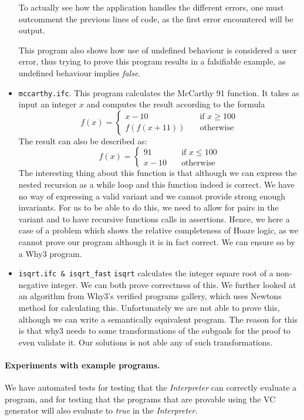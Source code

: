 \begin{itemize}
	To actually see how the application handles the different errors, one must outcomment the previous lines of code, as the first error encountered will be output.

	This program also shows how use of undefined behaviour is considered a user error, thus trying to prove this program results in a falsifiable example, as undefined behaviour implies \textit{false}.

  \item{\texttt{mccarthy.ifc}.}
   This program calculates the McCarthy 91 function. It takes as input an integer $x$ and computes the result according to the formula
	\[ f(x) =
	  \begin{cases}
	    x - 10       & \quad \text{if } x \ge 100 \\
	    f(f(x + 11))  & \quad \text{otherwise}
	  \end{cases}
  \]
  The result can also be described as:
	\[ f(x) =
	  \begin{cases}
	    91       & \quad \text{if } x \leq 100 \\
	    x - 10   & \quad \text{otherwise}
	  \end{cases}
	\]
  The interesting thing about this function is that although we can express the nested recursion as a while loop and this function indeed is correct.
        We have no way of expressing a valid variant and we cannot provide strong enough invariants.
        For us to be able to do this, we need to allow for pairs in the variant and to have recursive functions calls in assertions.
        Hence, we here a case of a problem which shows the relative completeness of Hoare logic, as we cannot prove our program although it is in fact correct. We can ensure so by a Why3 program.
  \item{\texttt{isqrt.ifc \& isqrt_fast}}
        \texttt{isqrt} calculates the integer square root of a non-negative integer. We can both prove correctness of this.
        We further looked at an algorithm from Why3's verified programs gallery, which uses Newtons method for calculating this\cite{}.
        Unfortunately we are not able to prove this, although we can write a semantically equivalent program. The reason for this is that why3 needs to some transformations of the subgoals for the proof to even validate it. Our solutions is not able any of such transformations.
\end{itemize}

\paragraph{Experiments with example programs.}
We have automated tests for testing that the \textit{Interpreter} can correctly evaluate a program,
and for testing that the programs that are provable using the VC generator will also evaluate to \textit{true} in the \textit{Interpreter}.

